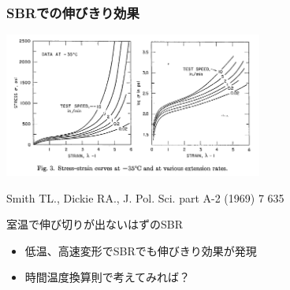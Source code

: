 \documentclass[11pt, dvipdfmx]{beamer}
\begin{document}
\begin{frame}
\frametitle{SBRでの伸びきり効果}

\centering
\includegraphics[width=8.5cm]{./fig/SBR_lowTemp_2.png}

{\tiny Smith TL., Dickie RA., J. Pol. Sci. part A-2 (1969) 7 635}

\begin{alertblock}{室温で伸び切りが出ないはずのSBR}
\begin{itemize}
\item
低温、高速変形でSBRでも伸びきり効果が発現
\item
時間温度換算則で考えてみれば？
\end{itemize}
\end{alertblock}
\end{frame}
\end{document}
